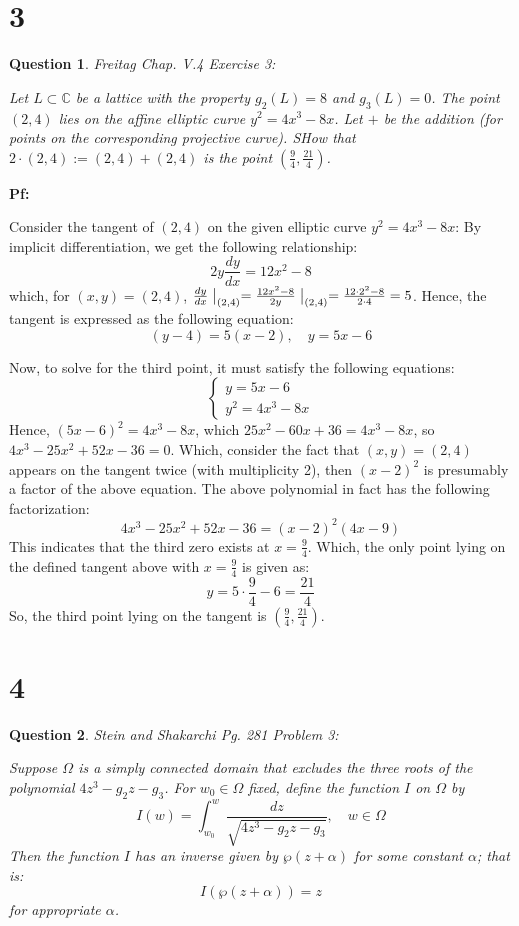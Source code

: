 \documentclass{article}
\newtheorem{question}{Question}
\begin{document}
\break

\section*{3}
\begin{myBox}[]{}
    \begin{question}
        Freitag Chap. V.4 Exercise 3:

        Let $L\subset \mathbb{C}$ be a lattice with the property $g_2(L)=8$ and $g_3(L)=0$. The point $(2,4)$ lies on the affine elliptic curve $y^2=4x^3-8x$.
        Let $+$ be the addition (for points on the corresponding projective curve). SHow that $2\cdot (2,4):= (2,4)+(2,4)$ is the point $(\frac{9}{4},\frac{21}{4})$.
    \end{question}
\end{myBox}

\textbf{Pf:}

Consider the tangent of $(2,4)$ on the given elliptic curve $y^2=4x^3-8x$: By implicit differentiation, we get the following relationship:
$$2y\frac{dy}{dx}=12x^2-8$$
which, for $(x,y)=(2,4)$, $\frac{dy}{dx}\bigm|_{(2,4)}=\frac{12x^2-8}{2y}\bigm|_{(2,4)} = \frac{12\cdot 2^2-8}{2\cdot 4} = 5$. Hence, the tangent is expressed as the following equation:
$$(y-4)=5(x-2),\quad y=5x-6$$

\hfil

Now, to solve for the third point, it must satisfy the following equations:
$$\begin{cases}
    y=5x-6\\
    y^2=4x^3-8x
\end{cases}$$
Hence, $(5x-6)^2 = 4x^3-8x$, which $25x^2-60x+36 = 4x^3-8x$, so $4x^3-25x^2+52x-36 = 0$. Which, consider the fact that $(x,y)=(2,4)$ appears on the tangent twice (with multiplicity 2),
then $(x-2)^2$ is presumably a factor of the above equation. The above polynomial in fact has the following factorization:
$$4x^3-25x^2+52x-36 = (x-2)^2(4x-9)$$
This indicates that the third zero exists at $x=\frac{9}{4}$. Which, the only point lying on the defined tangent above with $x=\frac{9}{4}$ is given as:
$$y=5\cdot\frac{9}{4}-6 = \frac{21}{4}$$
So, the third point lying on the tangent is $(\frac{9}{4},\frac{21}{4})$.


\break

\section*{4}
\begin{myBox}[]{}
    \begin{question}
        Stein and Shakarchi Pg. 281 Problem 3:

        Suppose $\Omega$ is a simply connected domain that excludes the three roots of the polynomial $4z^3-g_2z-g_3$.
        For $w_0\in\Omega$ fixed, define the function $I$ on $\Omega$ by 
        $$I(w)=\int_{w_0}^{w}\frac{dz}{\sqrt{4z^3-g_2z-g_3}},\quad w\in\Omega$$
        Then the function $I$ has an inverse given by $\wp(z+\alpha)$ for some constant $\alpha$; that is:
        $$I(\wp(z+\alpha))=z$$
        for appropriate $\alpha$.
    \end{question}
\end{myBox}
\end{document}
